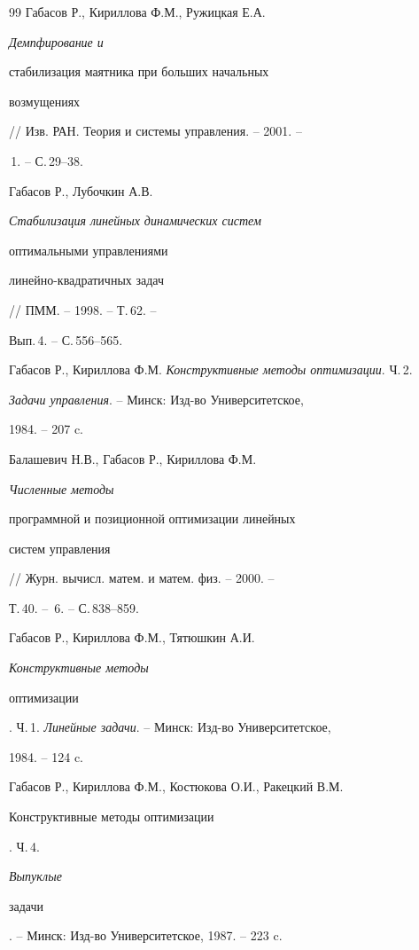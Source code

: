\begin{thebibliography}{99}
Габасов Р., Кириллова Ф.М., Ружицкая Е.А. {\it Демпфирование и


стабилизация маятника при больших начальных


возмущениях} // Изв. РАН. Теория и системы управления. -- 2001. --


\No\,1. -- С.\,29--38.







Габасов Р., Лубочкин А.В. {\it Стабилизация линейных динамических систем


оптимальными управлениями


линейно-квадратичных задач} // ПММ. -- 1998. -- Т.\,62. --


Вып.\,4. -- С.\,556--565.







Габасов Р., Кириллова Ф.М. {\it Конструктивные методы оптимизации}. Ч.\,2.


{\em Задачи управления}. -- Минск: Изд-во Университетское,


1984. -- 207 c.







Балашевич Н.В., Габасов Р., Кириллова Ф.М. {\it Численные методы


программной и позиционной оптимизации линейных


систем управления} // Журн. вычисл. матем. и матем. физ. -- 2000. --


Т.\,40. -- \No\,6. -- С.\,838--859.







Габасов Р., Кириллова Ф.М., Тятюшкин А.И. {\it Конструктивные методы


оптимизации}. Ч.\,1. {\em Линейные задачи}. -- Минск: Изд-во Университетское,


1984. -- 124 c.







Габасов Р., Кириллова Ф.М., Костюкова О.И., Ракецкий В.М. {\it


Конструктивные методы оптимизации}. Ч.\,4. {\em Выпуклые


задачи}. -- Минск: Изд-во Университетское, 1987. -- 223 c.






\end{thebibliography}
